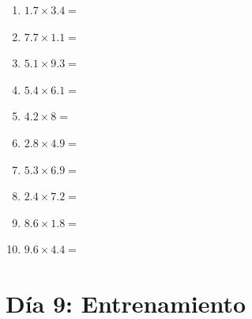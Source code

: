 \documentclass[12pt]{article}
\begin{document}
\begin{enumerate}
\newpage
\item \large $ 1.7 \times 3.4 = $ \vspace{1.5cm}
\item \large $ 7.7 \times 1.1 = $ \vspace{1.5cm}
\item \large $ 5.1 \times 9.3 = $ \vspace{1.5cm}
\item \large $ 5.4 \times 6.1 = $ \vspace{1.5cm}
\item \large $ 4.2 \times 8 = $ \vspace{1.5cm}
\item \large $ 2.8 \times 4.9 = $ \vspace{1.5cm}
\item \large $ 5.3 \times 6.9 = $ \vspace{1.5cm}
\item \large $ 2.4 \times 7.2 = $ \vspace{1.5cm}
\item \large $ 8.6 \times 1.8 = $ \vspace{1.5cm}
\item \large $ 9.6 \times 4.4 = $ \vspace{1.5cm}
\end{enumerate}\newpage
\section*{Día 9: Entrenamiento}
\end{document}
